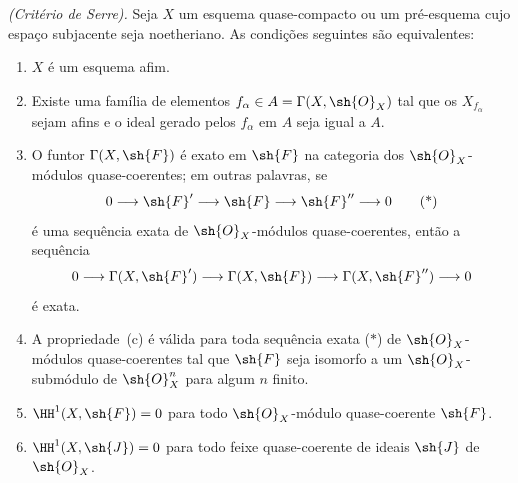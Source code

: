 \documentclass[oneside,10pt]{amsart}
\makeatletter
\newcommand{\ega@arrow}[2]{\mathchoice{#1}{#2}{#2}{#2}}
\renewcommand{\to}{\ega@arrow{\longrightarrow}{\rightarrow}}
\let\EGAOriginalLabel\label
\renewcommand{\label}[1]{\phantomsection\EGAOriginalLabel{#1}}
\makeatother
\begin{document}
\begin{theorem}[5.2.1]
\label{II.5.2.1}
\emph{(Critério de Serre).}
Seja $X$ um esquema quase-compacto ou um pré-esquema cujo espaço subjacente seja noetheriano.
As condições seguintes são equivalentes:
\begin{enumerate}
  \item[{\rm(a)}] $X$ é um esquema afim.
  \item[{\rm(b)}] Existe uma família de elementos $f_\alpha\in A=\Gamma(X,\sh{O}_X)$ tal que os $X_{f_\alpha}$ sejam afins e o ideal gerado pelos $f_\alpha$ em $A$ seja igual a $A$.
  \item[{\rm(c)}] O funtor $\Gamma(X,\sh{F})$ é exato em $\sh{F}$ na categoria dos $\sh{O}_X$-módulos quase-coerentes; em outras palavras, se
    \[
      0\to\sh{F}'\to\sh{F}\to\sh{F}''\to0
      \tag{*}
    \]
    é uma sequência exata de $\sh{O}_X$-módulos quase-coerentes, então a sequência
    \[
      0\to\Gamma(X,\sh{F}')\to\Gamma(X,\sh{F})\to\Gamma(X,\sh{F}'')\to0
    \]
    é exata.
  \item[{\rm(c')}] A propriedade~{\rm(c)} é válida para toda sequência exata {\rm($*$)} de $\sh{O}_X$-módulos quase-coerentes tal que $\sh{F}$ seja isomorfo a um $\sh{O}_X$-submódulo de $\sh{O}_X^n$ para algum $n$ finito.
  \item[{\rm(d)}] $\HH^1(X,\sh{F})=0$ para todo $\sh{O}_X$-módulo quase-coerente $\sh{F}$.
  \item[{\rm(d$'$)}] $\HH^1(X,\sh{J})=0$ para todo feixe quase-coerente de ideais $\sh{J}$ de $\sh{O}_X$.
\end{enumerate}
\end{theorem}
\end{document}
